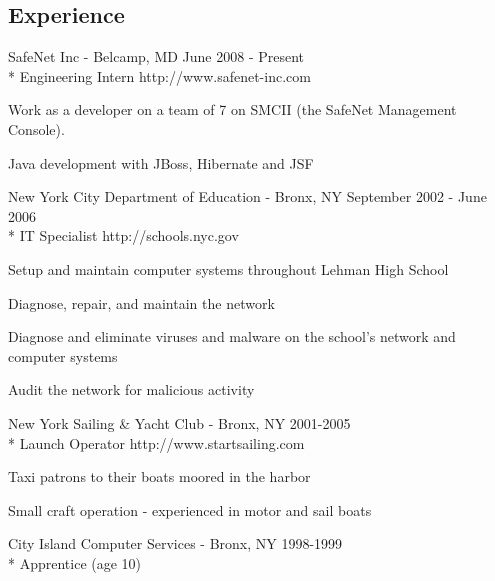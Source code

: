 \documentclass[margin,line]{resume}
\begin{document}
\begin{resume}
\section{\mysidestyle Experience}
	\begin{compactdesc}
		\item[SafeNet Inc] - Belcamp, MD \hfill {\small June 2008 - Present}
		\\* Engineering Intern \hfill {\footnotesize http://www.safenet-inc.com}
		\begin{compactitem}
			\item {\small Work as a developer on a team of 7 on SMCII (the SafeNet
			Management Console).}
			\item {\small Java development with JBoss, Hibernate and JSF}
		\end{compactitem}
		\item[New York City Department of Education] - Bronx, NY \hfill
		{\small September 2002 - June 2006}
		\\* IT Specialist \hfill {\footnotesize http://schools.nyc.gov}
		\begin{compactitem}
			\item {\small Setup and maintain computer systems throughout Lehman
			High School}
			\item {\small Diagnose, repair, and maintain the network}
			\item {\small Diagnose and eliminate viruses and malware on the
			school's network and computer systems}
			\item {\small Audit the network for malicious activity}
		\end{compactitem}

		\item[New York Sailing \& Yacht Club] - Bronx, NY \hfill {\small
		2001-2005}
		\\* Launch Operator \hfill {\footnotesize http://www.startsailing.com}
		\begin{compactitem}
			\item {\small Taxi patrons to their boats moored in the harbor}
			\item {\small Small craft operation - experienced in motor and sail
			boats}
		\end{compactitem}

		\item[City Island Computer Services] - Bronx, NY \hfill {\small
		1998-1999}
		\\* Apprentice (age 10)
	\end{compactdesc}


\end{resume}
\end{document}
